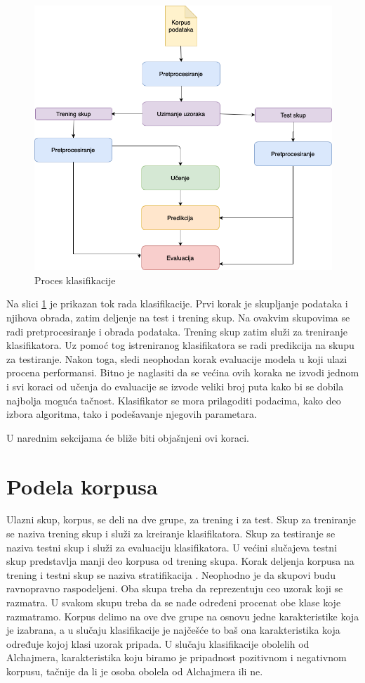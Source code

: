 \documentclass[12pt,oneside]{memoir}
\begin{document}
\begin{figure}[h!]
\centering
\includegraphics[width=.7\textwidth]{images/workflow.png}
\caption{Proces klasifikacije}
\label{img:workflow}
\end{figure}

Na slici \ref{img:workflow} je prikazan tok rada klasifikacije. Prvi korak je skupljanje podataka i njihova obrada, zatim deljenje na test i trening skup. Na ovakvim skupovima se radi pretprocesiranje i obrada podataka. Trening skup zatim služi za treniranje klasifikatora. Uz pomoć tog istreniranog klasifikatora se radi predikcija na skupu za testiranje. Nakon toga, sledi neophodan korak evaluacije modela u koji ulazi procena performansi. Bitno je naglasiti da se većina ovih koraka ne izvodi jednom i svi koraci od učenja do evaluacije se izvode veliki broj puta kako bi se dobila najbolja moguća tačnost. Klasifikator se mora prilagoditi podacima, kako deo izbora algoritma, tako i podešavanje njegovih parametara.

U narednim sekcijama će bliže biti objašnjeni ovi koraci.  

\section{Podela korpusa}

Ulazni skup, korpus, se deli na dve grupe, za trening i za test. Skup za treniranje se naziva trening skup i služi za kreiranje klasifikatora. Skup za testiranje se naziva testni skup i služi za evaluaciju klasifikatora. U većini slučajeva testni skup predstavlja manji deo korpusa od trening skupa. Korak deljenja korpusa na trening i testni skup se naziva stratifikacija \cite{MarijaMR}. Neophodno je da skupovi budu ravnopravno raspodeljeni. Oba skupa treba da reprezentuju ceo uzorak koji se razmatra. U svakom skupu treba da se nađe određeni procenat obe klase koje razmatramo. Korpus delimo na ove dve grupe na osnovu jedne karakteristike koja je izabrana, a u slučaju klasifikacije je najčešće to baš ona karakteristika koja određuje kojoj klasi uzorak pripada. U slučaju klasifikacije obolelih od Alchajmera, karakteristika koju biramo je pripadnost pozitivnom i negativnom korpusu, tačnije da li je osoba obolela od Alchajmera ili ne.  
\end{document}
